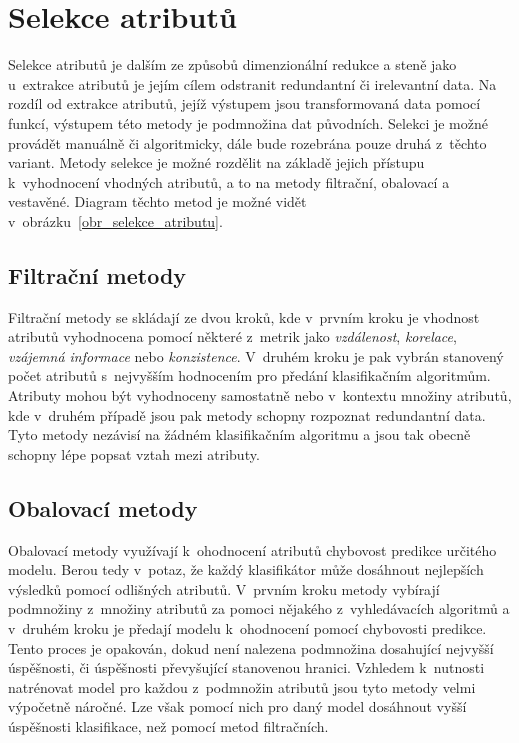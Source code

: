 \section{Selekce atributů}
\label{selekce_atributu}
Selekce atributů je dalším ze způsobů dimenzionální redukce a steně jako u~extrakce atributů je jejím cílem odstranit redundantní či irelevantní data. Na rozdíl od extrakce atributů, jejíž výstupem jsou transformovaná data pomocí funkcí, výstupem této metody je podmnožina dat původních. Selekci je možné provádět manuálně či algoritmicky, dále bude rozebrána pouze druhá z~těchto variant. Metody selekce je možné rozdělit na základě jejich přístupu k~vyhodnocení vhodných atributů, a to na metody filtrační, obalovací a vestavěné. Diagram těchto metod je možné vidět v~obrázku~\ref{obr_selekce_atributu}.\cite{data_classification}\cite{aca}

\subsection*{Filtrační metody}
\label{filtracni_metody}
Filtrační metody se skládají ze dvou kroků, kde v~prvním kroku je vhodnost atributů vyhodnocena pomocí některé z~metrik jako \textit{vzdálenost}, \textit{korelace}, \textit{vzájemná informace} nebo \textit{konzistence}. V~druhém kroku je pak vybrán stanovený počet atributů s~nejvyšším hodnocením pro předání klasifikačním algoritmům. Atributy mohou být vyhodnoceny samostatně nebo v~kontextu množiny atributů, kde v~druhém případě jsou pak metody schopny rozpoznat redundantní data. Tyto metody nezávisí na žádném klasifikačním algoritmu a jsou tak obecně schopny lépe popsat vztah mezi atributy.\cite{data_classification}\cite{data_preprocessing}\cite{aca}

\subsection*{Obalovací metody}
\label{obalovaci_metody}
Obalovací metody využívají k~ohodnocení atributů chybovost predikce určitého modelu. Berou tedy v~potaz, že každý klasifikátor může dosáhnout nejlepších výsledků pomocí odlišných atributů. V~prvním kroku metody vybírají podmnožiny z~množiny atributů za pomoci nějakého z~vyhledávacích algoritmů a v~druhém kroku je předají modelu k~ohodnocení pomocí chybovosti predikce. Tento proces je opakován, dokud není nalezena podmnožina dosahující nejvyšší úspěšnosti, či úspěšnosti převyšující stanovenou hranici. Vzhledem k~nutnosti natrénovat model pro každou z~podmnožin atributů jsou tyto metody velmi výpočetně náročné. Lze však pomocí nich pro daný model dosáhnout vyšší úspěšnosti klasifikace, než pomocí metod filtračních.\cite{data_classification}\cite{data_preprocessing}\cite{aca}

